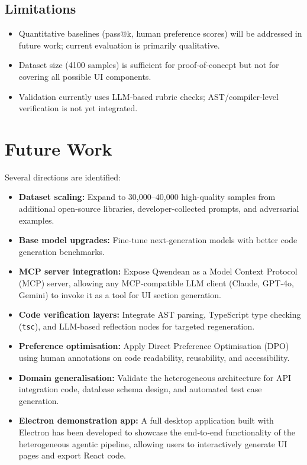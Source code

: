 \documentclass[pdflatex,sn-mathphys-num]{sn-jnl}
\theoremstyle{thmstyleone}
\theoremstyle{thmstyletwo}
\theoremstyle{thmstylethree}
\begin{document}
\subsection{Limitations}
\begin{itemize}
    \item Quantitative baselines (pass@k, human preference scores) will be addressed in future work; current evaluation is primarily qualitative.
    \item Dataset size (4100 samples) is sufficient for proof‑of‑concept but not for covering all possible UI components.
    \item Validation currently uses LLM‑based rubric checks; AST/compiler‑level verification is not yet integrated.
\end{itemize}

\section{Future Work}\label{sec:future}

Several directions are identified:
\begin{itemize}
    \item \textbf{Dataset scaling:} Expand to 30,000–40,000 high‑quality samples from additional open‑source libraries, developer‑collected prompts, and adversarial examples.
    \item \textbf{Base model upgrades:} Fine‑tune next‑generation models with better code generation benchmarks.
    \item \textbf{MCP server integration:} Expose Qwendean as a Model Context Protocol (MCP) server, allowing any MCP‑compatible LLM client (Claude, GPT-4o, Gemini) to invoke it as a tool for UI section generation.
    \item \textbf{Code verification layers:} Integrate AST parsing, TypeScript type checking (\texttt{tsc}), and LLM‑based reflection nodes for targeted regeneration.
    \item \textbf{Preference optimisation:} Apply Direct Preference Optimisation (DPO) using human annotations on code readability, reusability, and accessibility.
    \item \textbf{Domain generalisation:} Validate the heterogeneous architecture for API integration code, database schema design, and automated test case generation.
    \item \textbf{Electron demonstration app:} A full desktop application built with Electron has been developed to showcase the end‑to‑end functionality of the heterogeneous agentic pipeline, allowing users to interactively generate UI pages and export React code.
\end{itemize}
\end{document}
